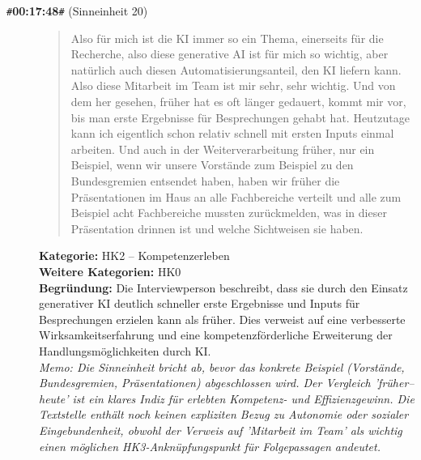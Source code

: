 \begin{description}
  \item[\texttt{\#}\textbf{00:17:48}\texttt{\#} (Sinneinheit 20)]
  \begin{quote}
  Also für mich ist die KI immer so ein Thema, einerseits für die Recherche, also diese generative AI ist für mich so wichtig, aber natürlich auch diesen Automatisierungsanteil, den KI liefern kann. Also diese Mitarbeit im Team ist mir sehr, sehr wichtig. Und von dem her gesehen, früher hat es oft länger gedauert, kommt mir vor, bis man erste Ergebnisse für Besprechungen gehabt hat. Heutzutage kann ich eigentlich schon relativ schnell mit ersten Inputs einmal arbeiten. Und auch in der Weiterverarbeitung früher, nur ein Beispiel, wenn wir unsere Vorstände zum Beispiel zu den Bundesgremien entsendet haben, haben wir früher die Präsentationen im Haus an alle Fachbereiche verteilt und alle zum Beispiel acht Fachbereiche mussten zurückmelden, was in dieser Präsentation drinnen ist und welche Sichtweisen sie haben.
  \end{quote}
  \textbf{Kategorie:} HK2 -- Kompetenzerleben\\
  \textbf{Weitere Kategorien:} HK0\\
  \textbf{Begr\"undung:} Die Interviewperson beschreibt, dass sie durch den Einsatz generativer KI deutlich schneller erste Ergebnisse und Inputs für Besprechungen erzielen kann als früher. Dies verweist auf eine verbesserte Wirksamkeitserfahrung und eine kompetenzförderliche Erweiterung der Handlungsmöglichkeiten durch KI.
  \\\textit{Memo: Die Sinneinheit bricht ab, bevor das konkrete Beispiel (Vorstände, Bundesgremien, Präsentationen) abgeschlossen wird. Der Vergleich 'früher–heute' ist ein klares Indiz für erlebten Kompetenz- und Effizienzgewinn. Die Textstelle enthält noch keinen expliziten Bezug zu Autonomie oder sozialer Eingebundenheit, obwohl der Verweis auf 'Mitarbeit im Team' als wichtig einen möglichen HK3-Anknüpfungspunkt für Folgepassagen andeutet.}
\end{description}
\medskip

